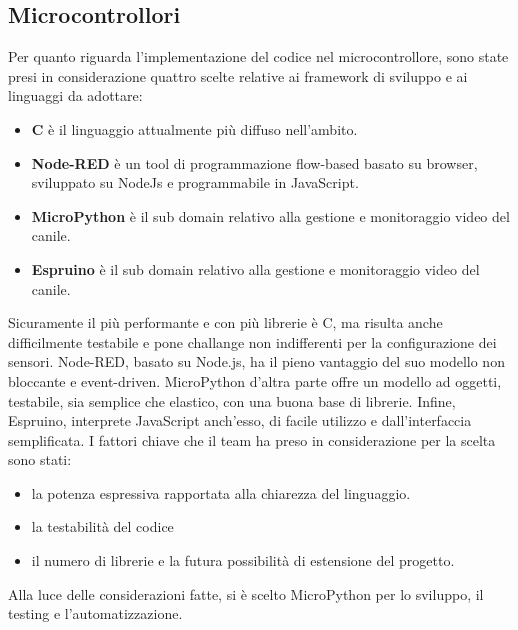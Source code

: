         \subsection{Microcontrollori}
        Per quanto riguarda l'implementazione del codice nel microcontrollore, sono state presi in considerazione quattro scelte relative ai framework di sviluppo e ai linguaggi da adottare: 
        \begin{itemize}
            \item \textbf{C} è il linguaggio attualmente più diffuso nell'ambito. 
            
            \item \textbf{Node-RED} è un tool di programmazione flow-based basato su browser, sviluppato su NodeJs e programmabile in JavaScript.
            
            \item \textbf{MicroPython} è il sub domain relativo alla gestione e monitoraggio video del canile.
            
            \item \textbf{Espruino} è il sub domain relativo alla gestione e monitoraggio video del canile.
        \end{itemize}
        Sicuramente il più performante e con più librerie è C, ma risulta anche difficilmente testabile e pone challange non indifferenti per la configurazione dei sensori. Node-RED, basato su Node.js, ha il pieno vantaggio del suo modello non bloccante e event-driven. MicroPython d'altra parte offre un modello ad oggetti, testabile, sia semplice che elastico, con una buona base di librerie. Infine, Espruino, interprete JavaScript anch'esso, di facile utilizzo e dall'interfaccia semplificata. 
        I fattori chiave che il team ha preso in considerazione per la scelta sono stati: 
        \begin{itemize}
            \item la potenza espressiva rapportata alla chiarezza del linguaggio. 
            \item la testabilità del codice
            \item il numero di librerie e la futura possibilità di estensione del progetto.
        \end{itemize}
        Alla luce delle considerazioni fatte, si è scelto MicroPython per lo sviluppo, il testing e l'automatizzazione.
